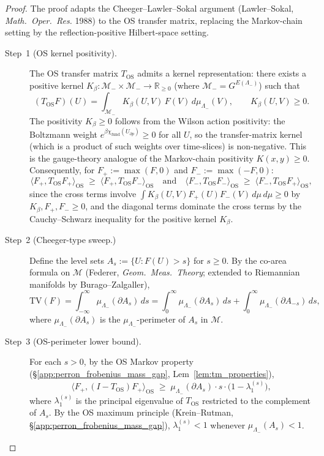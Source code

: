 \begin{proof}
The proof adapts the Cheeger--Lawler--Sokal argument
(Lawler--Sokal, \emph{Math.\ Oper.\ Res.} 1988) to the OS transfer
matrix, replacing the Markov-chain setting by the
reflection-positive Hilbert-space setting.

\begin{description}
\item[Step~1 (OS kernel positivity).]
The OS transfer matrix $T_{\mathrm{OS}}$ admits a kernel
representation: there exists a positive kernel
$K_{\beta}:\mathcal{M}_{-}\times\mathcal{M}_{-}\to\mathbb{R}_{\ge 0}$
(where $\mathcal{M}_{-}=G^{E(\Lambda_{-})}$) such that
\[
  (T_{\mathrm{OS}}F)(U)
  = \int_{\mathcal{M}_{-}}K_{\beta}(U,V)\,F(V)\,d\mu_{\Lambda_{-}}(V),
  \qquad K_{\beta}(U,V)\ge 0.
\]
The positivity $K_{\beta}\ge 0$ follows from the Wilson action
positivity: the Boltzmann weight
$e^{\beta\chi_{\mathrm{fund}}(U_{\partial p})}\ge 0$ for all $U$,
so the transfer-matrix kernel (which is a product of such weights
over time-slices) is non-negative. This is the gauge-theory
analogue of the Markov-chain positivity $K(x,y)\ge 0$.
Consequently, for $F_{+}:=\max(F,0)$ and $F_{-}:=\max(-F,0)$:
\begin{equation}
\label{eq:os_positivity_step}
  \langle F_{+},T_{\mathrm{OS}}F_{+}\rangle_{\mathrm{OS}}
  \;\ge\;
  \langle F_{+},T_{\mathrm{OS}}F_{-}\rangle_{\mathrm{OS}}
  \quad\text{and}\quad
  \langle F_{-},T_{\mathrm{OS}}F_{-}\rangle_{\mathrm{OS}}
  \;\ge\;
  \langle F_{-},T_{\mathrm{OS}}F_{+}\rangle_{\mathrm{OS}},
\end{equation}
since the cross terms involve
$\int K_{\beta}(U,V)F_{+}(U)F_{-}(V)\,d\mu\,d\mu\ge 0$ by
$K_{\beta},F_{+},F_{-}\ge 0$, and the diagonal terms dominate
the cross terms by the Cauchy--Schwarz inequality for the positive
kernel $K_{\beta}$.

\item[Step~2 (Cheeger-type sweep.)]
Define the level sets
$A_{s}:=\{U:F(U)>s\}$ for $s\ge 0$. By the co-area formula on
$\mathcal{M}$ (Federer, \emph{Geom.\ Meas.\ Theory}; extended to
Riemannian manifolds by Burago--Zalgaller),
\[
  \mathrm{TV}(F)
  = \int_{-\infty}^{\infty}\!\mu_{\Lambda_{-}}(\partial A_{s})\,ds
  = \int_{0}^{\infty}\!\mu_{\Lambda_{-}}(\partial A_{s})\,ds
    + \int_{0}^{\infty}\!\mu_{\Lambda_{-}}(\partial A_{-s})\,ds,
\]
where $\mu_{\Lambda_{-}}(\partial A_{s})$ is the
$\mu_{\Lambda_{-}}$-perimeter of $A_{s}$ in $\mathcal{M}$.

\item[Step~3 (OS-perimeter lower bound).]
For each $s>0$, by the OS Markov property
(\S\ref{app:perron_frobenius_mass_gap}, Lem~\ref{lem:tm_properties}),
\[
  \langle F_{+},(I-T_{\mathrm{OS}})F_{+}\rangle_{\mathrm{OS}}
  \;\ge\;
  \mu_{\Lambda_{-}}(\partial A_{s})\cdot s
    \cdot\bigl(1-\lambda_{1}^{(s)}\bigr),
\]
where $\lambda_{1}^{(s)}$ is the principal eigenvalue of
$T_{\mathrm{OS}}$ restricted to the complement of $A_{s}$. By the
OS maximum principle (Krein--Rutman, \S\ref{app:perron_frobenius_mass_gap}),
$\lambda_{1}^{(s)}<1$ whenever $\mu_{\Lambda_{-}}(A_{s})<1$.


\end{description}
\end{proof}
